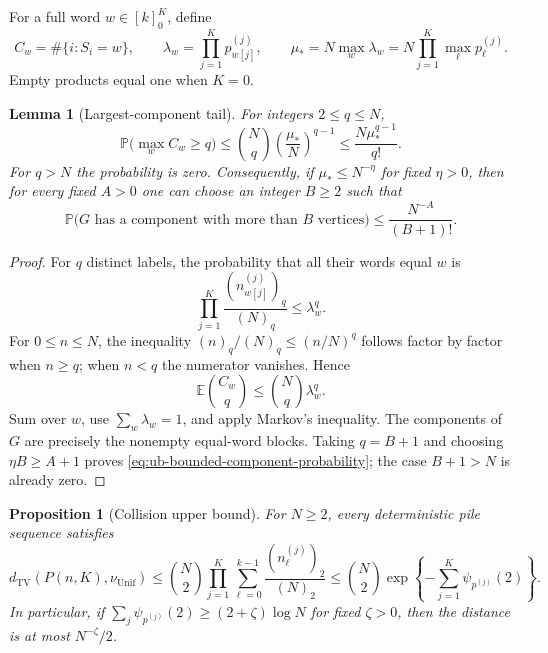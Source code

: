 \documentclass[11pt]{article}
\numberwithin{equation}{section}
\newtheorem{proposition}[proposition]{Proposition}
\newtheorem{lemma}[lemma]{Lemma}
\newcommand{\TV}{\mathrm{TV}}
\newcommand{\Unif}{\mathrm{Unif}}
\newcommand{\E}{\mathbb E}
\newcommand{\Pp}{\mathbb P}
\newcommand{\1}{\mathbf 1}
\newcommand{\dTV}{d_{\TV}}
\newcommand{\nuUnif}{\nu_{\Unif}}
\begin{document}
For a full word $w\in[k]_0^K$, define
\[
 C_w=\#\{i:S_i=w\},\qquad
 \lambda_w=\prod_{j=1}^Kp^{(j)}_{w[j]},\qquad
 \mu_*=N\max_w\lambda_w=N\prod_{j=1}^K\max_\ell p^{(j)}_\ell.
\]
Empty products equal one when $K=0$.

\begin{lemma}[Largest-component tail]
\label{lem:ub-largest-component-tail}
For integers $2\le q\le N$,
\begin{equation}
\label{eq:ub-largest-component-tail}
 \Pp\bigl(\max_w C_w\ge q\bigr)
 \le\binom Nq\left(\frac{\mu_*}{N}\right)^{q-1}
 \le\frac{N\mu_*^{q-1}}{q!}.
\end{equation}
For $q>N$ the probability is zero. Consequently, if
$\mu_*\le N^{-\eta}$ for fixed $\eta>0$, then for every fixed
$A>0$ one can choose an integer $B\ge2$ such that
\begin{equation}
\label{eq:ub-bounded-component-probability}
 \Pp\bigl(G\text{ has a component with more than }B\text{ vertices}\bigr)
 \le \frac{N^{-A}}{(B+1)!}.
\end{equation}
\end{lemma}

\begin{proof}
For $q$ distinct labels, the probability that all their words equal $w$
is
\[
 \prod_{j=1}^K\frac{(n^{(j)}_{w[j]})_q}{(N)_q}
 \le\lambda_w^q.
\]
For $0\le n\le N$, the inequality $(n)_q/(N)_q\le(n/N)^q$
follows factor by factor when $n\ge q$; when $n<q$ the numerator
vanishes. Hence
\[
 \E\binom{C_w}{q}\le\binom Nq\lambda_w^q.
\]
Sum over $w$, use $\sum_w\lambda_w=1$, and apply Markov's inequality.
The components of $G$ are precisely the nonempty equal-word blocks.
Taking $q=B+1$ and choosing $\eta B\ge A+1$ proves
\eqref{eq:ub-bounded-component-probability}; the case $B+1>N$ is
already zero.
\end{proof}

\begin{proposition}[Collision upper bound]
\label{prop:ub-collision-upper}
For $N\ge2$, every deterministic pile sequence satisfies
\begin{equation}
\label{eq:ub-collision-upper}
 \dTV(P(n,K),\nuUnif)
 \le\binom N2\prod_{j=1}^K
       \sum_{\ell=0}^{k-1}\frac{(n^{(j)}_\ell)_2}{(N)_2}
 \le\binom N2\exp\left\{-\sum_{j=1}^K\psi_{p^{(j)}}(2)\right\}.
\end{equation}
In particular, if $\sum_j\psi_{p^{(j)}}(2)\ge(2+\zeta)\log N$
for fixed $\zeta>0$, then the distance is at most $N^{-\zeta}/2$.
\end{proposition}
\end{document}
